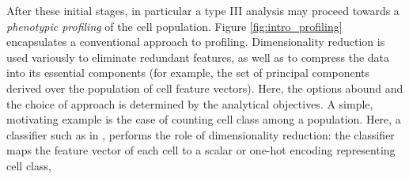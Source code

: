 

After these initial stages, in particular a type III analysis may proceed towards a \emph{phenotypic profiling} of the cell population. Figure \ref{fig:intro_profiling} encapsulates a conventional approach to profiling. Dimensionality reduction is used variously to eliminate redundant features, as well as to compress the data into its essential components (for example, the set of principal components derived over the population of cell feature vectors). Here, the options abound and the choice of approach is determined by the analytical objectives. A simple, motivating example is the case of counting cell class among a population. Here, a classifier such as in \cite{neumann2010phenotypic}, performs the role of dimensionality reduction: the classifier maps the feature vector of each cell to a scalar or one-hot encoding representing cell class,

